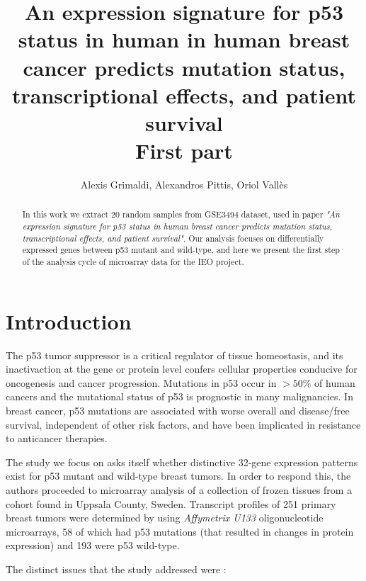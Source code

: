\documentclass{article}
\title{{\bf An expression signature for p53 status in human in human breast cancer predicts mutation status, transcriptional effects, and patient survival}\\{First part}}
\author{Alexis Grimaldi, Alexandros Pittis, Oriol Vall\`{e}s}
\begin{document}
\maketitle

\begin{abstract}
In this work we extract 20 random samples from GSE3494 dataset, used in paper {\it "An expression signature for p53 status in human breast cancer predicts mutation status, transcriptional effects, and patient survival"}. Our analysis focuses on differentially expressed genes between p53 mutant and wild-type, and here we present the first step of the analysis cycle of microarray data for the IEO project.
\end{abstract}


\section{Introduction}
The p53 tumor suppressor is a critical regulator of tissue homeostasis, and its inactivaction at the gene or protein level confers cellular properties conducive for oncogenesis and cancer progression. Mutations in p53 occur in $>50 \%$ of human cancers and the mutational status of p53 is prognostic in many malignancies. In breast cancer, p53 mutations are associated with worse overall and disease/free survival, independent of other risk factors, and have been implicated in resistance to anticancer therapies.\par
The study we focus on asks itself whether distinctive 32-gene expression patterns exist for p53 mutant and wild-type breast tumors. In order to respond this, the authors proceeded to microarray analysis of a collection of frozen tissues from a cohort found in Uppsala County, Sweden. Transcript profiles of 251 primary breast tumors were determined by using {\it Affymetrix U133} oligonucleotide microarrays, 58 of which had p53 mutations (that resulted in changes in protein expression) and 193 were p53 wild-type.\par
The distinct issues that the study addressed were :
\end{document}
